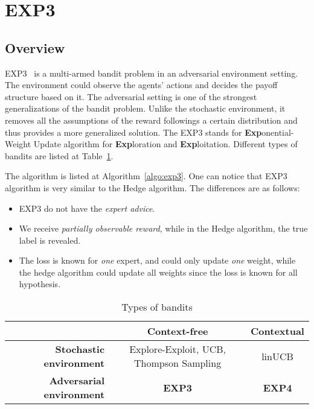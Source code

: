 \documentclass[11pt]{article}
\begin{document}
\section{EXP3}
\subsection{Overview}

EXP3~\cite{auer2002nonstochastic} is a multi-armed bandit problem in an adversarial environment setting. The environment could observe the agents' actions and decides the payoff structure based on it. The adversarial setting is one of the strongest generalizations of the bandit problem. Unlike the stochastic environment, it removes all the assumptions of the reward followings a certain distribution and thus provides a more generalized solution. The EXP3 stands for \textbf{Exp}onential-Weight Update algorithm for \textbf{Exp}loration and \textbf{Exp}loitation. Different types of bandits are listed at Table~\ref{tab:bandits}.


The algorithm is listed at Algorithm~\ref{algo:exp3}. One can notice that EXP3 algorithm is very similar to the Hedge algorithm. The differences are as follows:
\begin{itemize}
    \item EXP3 do not have the \textit{expert advice}.
    \item We receive \textit{partially observable reward}, while in the Hedge algorithm, the true label is revealed.
    \item The loss is known for \textit{one} expert, and could only update \textit{one} weight, while the hedge algorithm could update all weights since the loss is known for all hypothesis.
\end{itemize}

\begin{table}[h]
    \centering
    \begin{tabular}{r  c  c}
    \toprule
            & \textbf{Context-free} & \textbf{Contextual} \\
    \midrule
    \textbf{Stochastic environment}  & Explore-Exploit, UCB, Thompson Sampling & linUCB\\
    \textbf{Adversarial environment} & \textbf{EXP3} & \textbf{EXP4}\\
    \bottomrule
    \end{tabular}
    \caption{Types of bandits}
    \label{tab:bandits}
\end{table}
\end{document}
